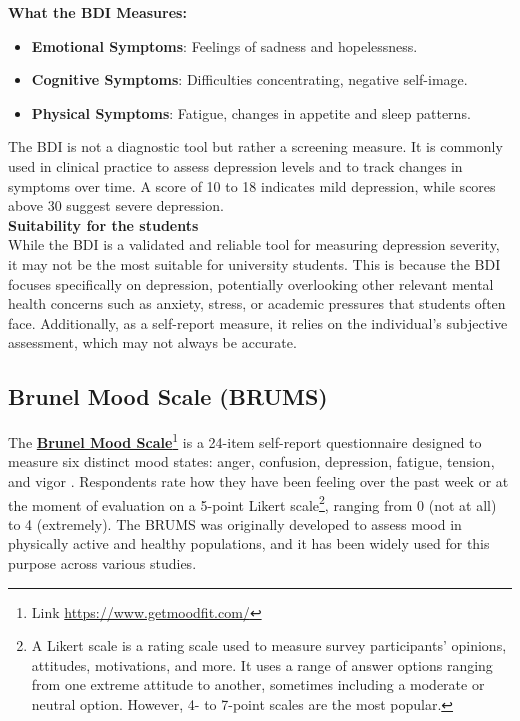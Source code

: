 \noindent \textbf{What the BDI Measures:}
\begin{itemize}
    \item \textbf{Emotional Symptoms}: Feelings of sadness and hopelessness.
    \item \textbf{Cognitive Symptoms}: Difficulties concentrating, negative self-image.
    \item \textbf{Physical Symptoms}: Fatigue, changes in appetite and sleep patterns.
\end{itemize}

\noindent The BDI is not a diagnostic tool but rather a screening measure. It is commonly used in clinical practice to assess depression levels and to track changes in symptoms over time. A score of 10 to 18 indicates mild depression, while scores above 30 suggest severe depression.\vspace{5mm} \\
\textbf{Suitability for the students} \\
While the BDI is a validated and reliable tool for measuring depression severity, it may not be the most suitable for university students. This is because the BDI focuses specifically on depression, potentially overlooking other relevant mental health concerns such as anxiety, stress, or academic pressures that students often face. Additionally, as a self-report measure, it relies on the individual's subjective assessment, which may not always be accurate.

\subsection{Brunel Mood Scale (BRUMS)}

The \textbf{\href{https://www.getmoodfit.com/}{Brunel Mood Scale}}\footnote{Link \url{https://www.getmoodfit.com/}} is a 24-item self-report questionnaire designed to measure six distinct mood states: anger, confusion, depression, fatigue, tension, and vigor \cite{brums-review}. Respondents rate how they have been feeling over the past week or at the moment of evaluation on a 5-point Likert scale\footnote{A Likert scale is a rating scale used to measure survey participants' opinions, attitudes, motivations, and more. It uses a range of answer options ranging from one extreme attitude to another, sometimes including a moderate or neutral option. However, 4- to 7-point scales are the most popular.}, ranging from 0 (not at all) to 4 (extremely). The BRUMS was originally developed to assess mood in physically active and healthy populations, and it has been widely used for this purpose across various studies.\vspace{5mm}

